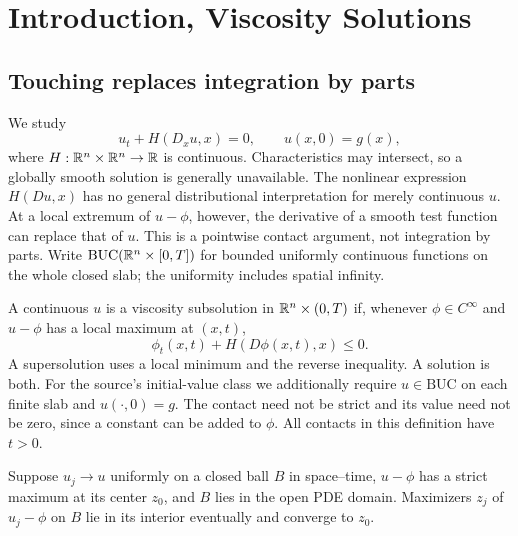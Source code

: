\section{Introduction, Viscosity Solutions}
\label{sec:10-1}
\subsection{Touching replaces integration by parts}
We study
\begin{equation}\label{eq:10-hj}
 u_t+H(D_xu,x)=0,\qquad u(x,0)=g(x),
\end{equation}
where $H:\mathbb{R}^n\times\mathbb{R}^n\to\mathbb{R}$ is continuous. Characteristics may
intersect, so a globally smooth solution is generally unavailable.
The nonlinear expression $H(Du,x)$ has no general distributional
interpretation for merely continuous $u$. At a local extremum of
$u-\phi$, however, the derivative of a smooth test function can replace
that of $u$. This is a pointwise contact argument, not integration by parts.
Write $\mathrm{BUC}(\mathbb{R}^n\times[0,T])$ for bounded uniformly continuous
functions on the whole closed slab; the uniformity includes spatial infinity.
\Needspace{55mm}
\begin{definition}
A continuous $u$ is a viscosity subsolution in $\mathbb{R}^n\times(0,T)$ if,
whenever $\phi\in C^\infty$ and $u-\phi$ has a local maximum at $(x,t)$,
\[
 \phi_t(x,t)+H(D\phi(x,t),x)\leq0.
\]
A supersolution uses a local minimum and the reverse inequality.
A solution is both. For the source's initial-value class we additionally
require $u\in\mathrm{BUC}$ on each finite slab and $u(\cdot,0)=g$.
The contact need not be strict and its value need not be zero, since a
constant can be added to $\phi$. All contacts in this definition have $t>0$.
\end{definition}
\Needspace{42mm}
\Needspace{55mm}
\begin{lemma}
Suppose $u_j\to u$ uniformly on a closed ball $B$ in space--time,
$u-\phi$ has a strict maximum at its center $z_0$, and $B$ lies in the
open PDE domain. Maximizers $z_j$ of $u_j-\phi$ on $B$ lie in its
interior eventually and converge to $z_0$.
\end{lemma}
